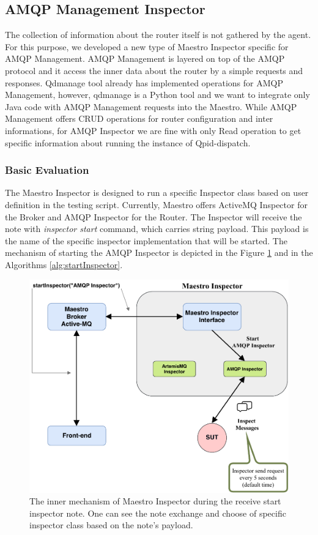 \subsection{AMQP Management Inspector}
\label{AMQP Management Inspector}
The collection of information about the router itself is not gathered by the agent. For this purpose, we developed a new type of Maestro Inspector specific for AMQP Management. AMQP Management is layered on top of the AMQP protocol and it access the inner data about the router by a simple requests and responses. Qdmanage tool already has implemented operations for AMQP Management, however, qdmanage is a Python tool and we want to integrate only Java code with AMQP Management requests into the Maestro. While AMQP Management offers CRUD operations for router configuration and inter informations, for AMQP Inspector we are fine with only Read operation to get specific information about running the instance of Qpid-dispatch.

\subsubsection*{Basic Evaluation}
The Maestro Inspector is designed to run a specific Inspector class based on user definition in the testing script. Currently, Maestro offers ActiveMQ Inspector for the Broker and AMQP Inspector for the Router. The Inspector will receive the note with \emph{inspector start} command, which carries string payload. This payload is the name of the specific inspector implementation that will be started. The mechanism of starting the AMQP Inspector is depicted in the Figure \ref{fig:inspector_start} and in the Algorithms \ref{alg:startInspector}.

\begin{figure}[H]
  \centering
  \includegraphics[width=13cm]{obrazky-figures/inspector_start.pdf}
  \caption{The inner mechanism of Maestro Inspector during the receive start inspector note. One can see the note exchange and choose of specific inspector class based on the note's payload.}
  \label{fig:inspector_start}
\end{figure}

